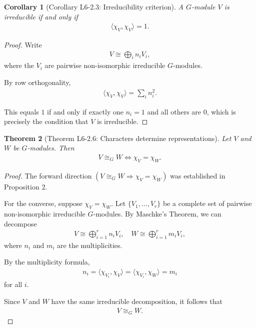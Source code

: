 \documentclass[titlepage]{article}
\theoremstyle{plain}
\newtheorem{theorem}{Theorem}[section]
\newtheorem{corollary}[theorem]{Corollary}
\theoremstyle{definition}
\theoremstyle{remark}
\theoremstyle{exercise-style}
\numberwithin{equation}{section}
\numberwithin{theorem}{section}
\numberwithin{remark}{section}
\begin{document}
\begin{myboxg}
    \begin{corollary}[Corollary L6-2.3: Irreducibility criterion]
        A $G$-module $V$ is irreducible if and only if
        \begin{align}
            \langle \chi_V, \chi_V \rangle = 1.
        \end{align}
    \end{corollary}
\end{myboxg}

\begin{proof}
    Write
    \begin{align}
        V \cong \bigoplus_i n_i V_i,
    \end{align}
    where the $V_i$ are pairwise non-isomorphic irreducible $G$-modules.
    
    By row orthogonality,
    \begin{align}
        \langle \chi_V, \chi_V \rangle = \sum_i n_i^2.
    \end{align}
    
    This equals $1$ if and only if exactly one $n_i = 1$ and all others are $0$, which is precisely the condition that $V$ is irreducible.
\end{proof}

\begin{myboxg}
    \begin{theorem}[Theorem L6-2.6: Characters determine representations]
        Let $V$ and $W$ be $G$-modules. Then
        \begin{align}
            V \cong_G W \iff \chi_V = \chi_W.
        \end{align}
    \end{theorem}
\end{myboxg}

\begin{proof}
    The forward direction $(V \cong_G W \Rightarrow \chi_V = \chi_W)$ was established in Proposition 2.
    
    For the converse, suppose $\chi_V = \chi_W$. Let $\{V_1,\dots,V_r\}$ be a complete set of pairwise non-isomorphic irreducible $G$-modules. By Maschke’s Theorem, we can decompose
    \begin{align}
        V \cong \bigoplus_{i=1}^r n_i V_i, \quad 
        W \cong \bigoplus_{i=1}^r m_i V_i,
    \end{align}
    where $n_i$ and $m_i$ are the multiplicities.
    
    By the multiplicity formula,
    \begin{align}
        n_i = \langle \chi_{V_i}, \chi_V \rangle = \langle \chi_{V_i}, \chi_W \rangle = m_i
    \end{align}
    for all $i$.
    
    Since $V$ and $W$ have the same irreducible decomposition, it follows that
    \begin{align}
        V \cong_G W.
    \end{align}
\end{proof}
\end{document}
